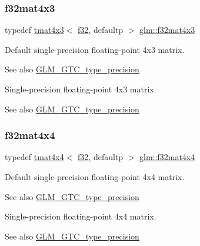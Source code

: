\subsubsection{\texorpdfstring{f32mat4x3}{f32mat4x3}}
{\footnotesize\ttfamily typedef \hyperlink{structglm_1_1tmat4x3}{tmat4x3}$<$ \hyperlink{group__gtc__type__precision_ga0ec999b57f5330d9021256e96038df04}{f32}, defaultp $>$ \hyperlink{group__gtc__type__precision_gad68d998fa74028e02bfadd4778bd549a}{glm\+::f32mat4x3}}

Default single-\/precision floating-\/point 4x3 matrix. \begin{DoxySeeAlso}{See also}
\hyperlink{group__gtc__type__precision}{G\+L\+M\+\_\+\+G\+T\+C\+\_\+type\+\_\+precision}
\end{DoxySeeAlso}
Single-\/precision floating-\/point 4x3 matrix. \begin{DoxySeeAlso}{See also}
\hyperlink{group__gtc__type__precision}{G\+L\+M\+\_\+\+G\+T\+C\+\_\+type\+\_\+precision} 
\end{DoxySeeAlso}
\mbox{\label{group__gtc__type__precision_gac4a4b2671cbf50ab95c55fce2bfcd811}} 
\subsubsection{\texorpdfstring{f32mat4x4}{f32mat4x4}}
{\footnotesize\ttfamily typedef \hyperlink{structglm_1_1tmat4x4}{tmat4x4}$<$ \hyperlink{group__gtc__type__precision_ga0ec999b57f5330d9021256e96038df04}{f32}, defaultp $>$ \hyperlink{group__gtc__type__precision_gac4a4b2671cbf50ab95c55fce2bfcd811}{glm\+::f32mat4x4}}

Default single-\/precision floating-\/point 4x4 matrix. \begin{DoxySeeAlso}{See also}
\hyperlink{group__gtc__type__precision}{G\+L\+M\+\_\+\+G\+T\+C\+\_\+type\+\_\+precision}
\end{DoxySeeAlso}
Single-\/precision floating-\/point 4x4 matrix. \begin{DoxySeeAlso}{See also}
\hyperlink{group__gtc__type__precision}{G\+L\+M\+\_\+\+G\+T\+C\+\_\+type\+\_\+precision} 
\end{DoxySeeAlso}
\mbox{\label{group__gtc__type__precision_gac59c4d798396552e4bbb866b3d8a2f18}} 
